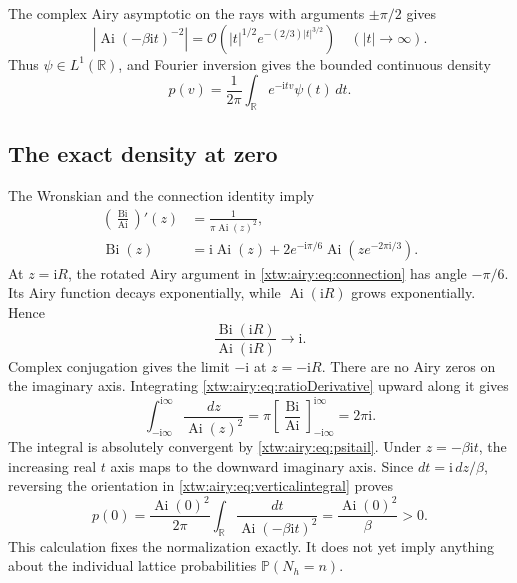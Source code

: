 \documentclass[11pt]{article}
\theoremstyle{remark}\newtheorem{remark}[theorem]{Remark}
\newcommand{\OO}{\mathcal O}
\newcommand{\R}{\mathbb R}
\newcommand{\Ai}{\operatorname{Ai}}
\newcommand{\Bi}{\operatorname{Bi}}
\newcommand{\Prb}{\mathbb P}
\begin{document}
The complex Airy asymptotic on the rays with arguments $\pm\pi/2$
\cite{dlmf7} gives
\begin{equation}\label{xtw:airy:eq:psitail}
 |\Ai(-\beta\mathrm it)^{-2}|
 =\OO\!\left(|t|^{1/2}e^{-(2/3)|t|^{3/2}}\right)
 \quad(|t|\to\infty).
\end{equation}
Thus $\psi\in L^1(\R)$, and Fourier inversion gives the bounded continuous
density
\begin{equation}\label{xtw:airy:eq:pdensity}
 p(v)=\frac1{2\pi}\int_{\R}e^{-\mathrm itv}\psi(t)\,dt.
\end{equation}

\subsection{The exact density at zero}
The Wronskian and the connection identity \cite{dlmf2} imply
\begin{align}
 \left(\frac{\Bi}{\Ai}\right)'(z)&=\frac1{\pi\Ai(z)^2},\label{xtw:airy:eq:ratioDerivative}\\
 \Bi(z)&=\mathrm i\Ai(z)+2e^{-\mathrm i\pi/6}
                      \Ai(ze^{-2\pi\mathrm i/3}).\label{xtw:airy:eq:connection}
\end{align}
At $z=\mathrm iR$, the rotated Airy argument in \eqref{xtw:airy:eq:connection} has
angle $-\pi/6$. Its Airy function decays exponentially, while
$\Ai(\mathrm iR)$ grows exponentially. Hence
\[
 \frac{\Bi(\mathrm iR)}{\Ai(\mathrm iR)}\longrightarrow\mathrm i.
\]
Complex conjugation gives the limit $-\mathrm i$ at $z=-\mathrm iR$.
There are no Airy zeros on the imaginary axis. Integrating
\eqref{xtw:airy:eq:ratioDerivative} upward along it gives
\begin{equation}\label{xtw:airy:eq:verticalintegral}
 \int_{-\mathrm i\infty}^{\mathrm i\infty}\frac{dz}{\Ai(z)^2}
 =\pi\left[\frac{\Bi}{\Ai}\right]_{-\mathrm i\infty}^{\mathrm i\infty}
 =2\pi\mathrm i.
\end{equation}
The integral is absolutely convergent by \eqref{xtw:airy:eq:psitail}. Under
$z=-\beta\mathrm it$, the increasing real $t$ axis maps to the downward
imaginary axis. Since $dt=\mathrm i\,dz/\beta$, reversing the orientation
in \eqref{xtw:airy:eq:verticalintegral} proves
\begin{equation}\label{xtw:airy:eq:pzero}
 p(0)=\frac{\Ai(0)^2}{2\pi}\int_{\R}\frac{dt}{\Ai(-\beta\mathrm it)^2}
     =\frac{\Ai(0)^2}{\beta}>0.
\end{equation}
This calculation fixes the normalization exactly. It does not yet imply
anything about the individual lattice probabilities $\Prb(N_h=n)$.
\end{document}
